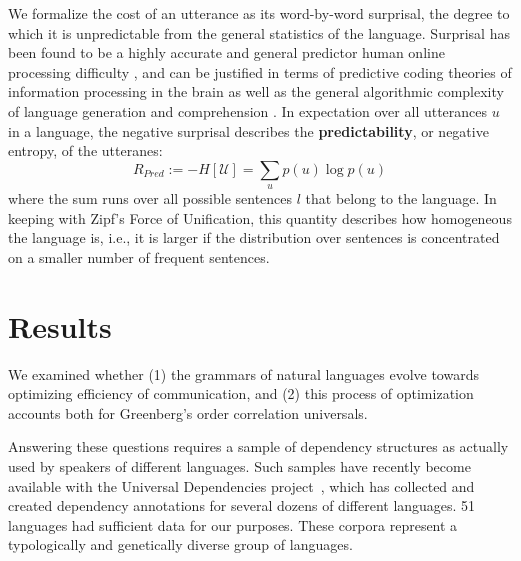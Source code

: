 \documentclass[9pt,twocolumn,twoside,lineno]{pnas-new}
\newcommand{\key}[1]{\textbf{#1}}
\begin{document}
We formalize the cost of an utterance as its word-by-word surprisal, the degree to which it is unpredictable from the general statistics of the language.
Surprisal has been found to be a highly accurate and general predictor human online processing difficulty \cite{hale2001probabilistic,levy2008expectation,smith2013effect}, and can be justified  in terms of predictive coding theories of information processing in the brain \cite{friston2009predictive} as well as the general algorithmic complexity of language generation and comprehension \cite{li2008introduction}.
In expectation over all utterances $u$ in a language, the negative surprisal describes the \key{predictability}, or negative entropy, of the utteranes: %
\begin{equation}
	R_{Pred} := - H[\mathcal{U}] = \sum_{u} p(u) \log p(u)
\end{equation}
where the sum runs over all possible sentences $l$ that belong to the language.
In keeping with Zipf's Force of Unification, this quantity describes how homogeneous the language is, i.e., it is larger if the distribution over sentences is concentrated on a smaller number of frequent sentences. %



\section{Results}

We examined whether
(1) the grammars of natural languages evolve towards optimizing efficiency of communication, and
(2) this process of optimization accounts both for Greenberg's order correlation universals.


Answering these questions requires a sample of dependency structures as actually used by speakers of different languages.
Such samples have recently become available with the Universal Dependencies project~\cite{nivre2017universal}, which has collected and created dependency annotations for several dozens of different languages.
51 languages had sufficient data for our purposes. %
These corpora represent a typologically and genetically diverse group of languages.
\end{document}
